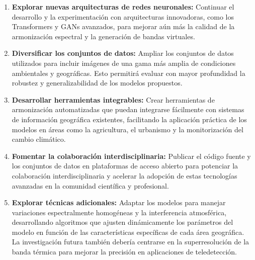        \begin{enumerate}
            \item \textbf{Explorar nuevas arquitecturas de redes neuronales:} Continuar el desarrollo y la experimentación con arquitecturas innovadoras, como los Transformers y GANs avanzados, para mejorar aún más la calidad de la armonización espectral y la generación de bandas virtuales.
            \item \textbf{Diversificar los conjuntos de datos:} Ampliar los conjuntos de datos utilizados para incluir imágenes de una gama más amplia de condiciones ambientales y geográficas. Esto permitirá evaluar con mayor profundidad la robustez y generalizabilidad de los modelos propuestos.
            \item \textbf{Desarrollar herramientas integrables:} Crear herramientas de armonización automatizadas que puedan integrarse fácilmente con sistemas de información geográfica existentes, facilitando la aplicación práctica de los modelos en áreas como la agricultura, el urbanismo y la monitorización del cambio climático.
            \item \textbf{Fomentar la colaboración interdisciplinaria:} Publicar el código fuente y los conjuntos de datos en plataformas de acceso abierto para potenciar la colaboración interdisciplinaria y acelerar la adopción de estas tecnologías avanzadas en la comunidad científica y profesional.
            \item \textbf{Explorar técnicas adicionales:} Adaptar los modelos para manejar variaciones espectralmente homogéneas y la interferencia atmosférica, desarrollando algoritmos que ajusten dinámicamente los parámetros del modelo en función de las características específicas de cada área geográfica. La investigación futura también debería centrarse en la superresolución de la banda térmica para mejorar la precisión en aplicaciones de teledetección.
        \end{enumerate}
